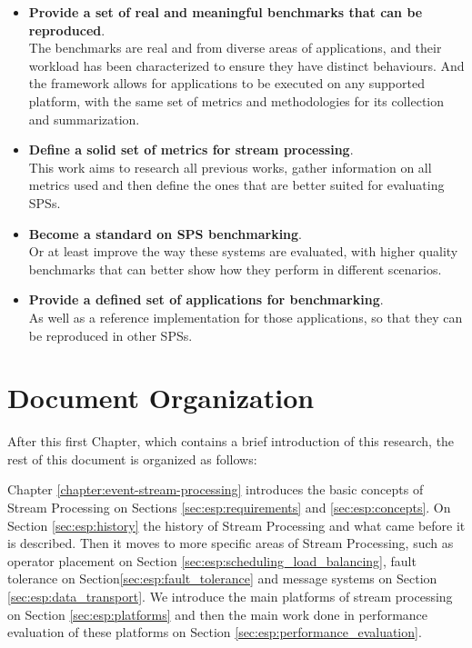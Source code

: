 \documentclass[ppgc,diss,english]{iiufrgs}
\begin{document}
\begin{itemize}
\item \textbf{Provide a set of real and meaningful benchmarks that can be reproduced}.\\
	  The benchmarks are real and from diverse areas of applications, and their workload has been characterized to ensure they have distinct behaviours. And the framework allows for applications to be executed on any supported platform, with the same set of metrics and methodologies for its collection and summarization. 

\item \textbf{Define a solid set of metrics for stream processing}.\\
	  This work aims to research all previous works, gather information on all metrics used and then define the ones that are better suited for evaluating SPSs.

\item \textbf{Become a standard on SPS benchmarking}.\\
      Or at least improve the way these systems are evaluated, with higher quality benchmarks that can better show how they perform in different scenarios.
      
\item \textbf{Provide a defined set of applications for benchmarking}.\\
      As well as a reference implementation for those applications, so that they can be reproduced in other SPSs.
      

\end{itemize}


\section{Document Organization}

After this first Chapter, which contains a brief introduction of this research, the rest of this document is organized as follows:

Chapter \ref{chapter:event-stream-processing} introduces the basic concepts of Stream Processing on Sections \ref{sec:esp:requirements} and \ref{sec:esp:concepts}. On Section \ref{sec:esp:history} the history of Stream Processing and what came before it is described. Then it moves to more specific areas of Stream Processing, such as operator placement on Section \ref{sec:esp:scheduling_load_balancing}, fault tolerance on Section\ref{sec:esp:fault_tolerance} and message systems on Section \ref{sec:esp:data_transport}. We introduce the main platforms of stream processing on Section \ref{sec:esp:platforms} and then the main work done in performance evaluation of these platforms on Section \ref{sec:esp:performance_evaluation}.
\end{document}
